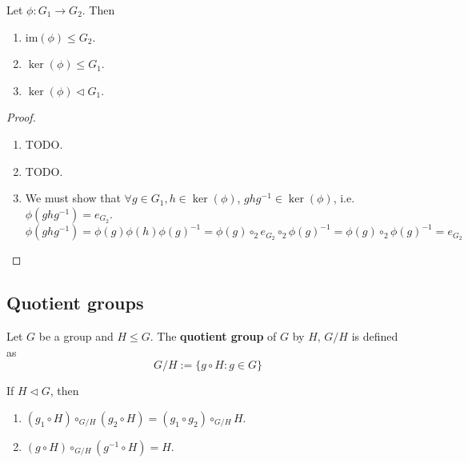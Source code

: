 \begin{proposition}
	Let $\phi: G_1 \rightarrow G_2$. Then
	\begin{enumerate}
		\item $\text{im}(\phi) \le G_2$.
		\item $\ker(\phi) \le G_1$.
		\item $\ker(\phi) \triangleleft G_1$.
	\end{enumerate}
\end{proposition}

\begin{proof}
	\hfill
	\begin{enumerate}
		\item TODO.
		\item TODO.
		\item We must show that $\forall g \in G_1, h \in \ker(\phi)$, $g h g^{-1} \in \ker(\phi)$, i.e. $\phi(g h g^{-1}) = e_{G_2}$.
		\[
			\phi(g h g^{-1}) = \phi(g) \phi(h) \phi(g)^{-1} = \phi(g) \circ_2 e_{G_2} \circ_2 \phi(g)^{-1} = \phi(g) \circ_2 \phi(g)^{-1} = e_{G_2}
		\]
	\end{enumerate}
\end{proof}

\subsection{Quotient groups}

\begin{definition}
	Let $G$ be a group and $H \le G$. The \textbf{quotient group} of $G$ by $H$, $G / H$ is defined as
	\[
		G / H := \{ g \circ H: g \in G \}
	\]
\end{definition}

\begin{proposition}
	If $H \triangleleft G$, then
	\begin{enumerate}
		\item $(g_1 \circ H) \circ_{G / H} (g_2 \circ H) = (g_1 \circ g_2) \circ_{G / H} H$.
		\item $(g \circ H) \circ_{G / H} (g^{-1} \circ H) = H$.
	\end{enumerate}
\end{proposition}

